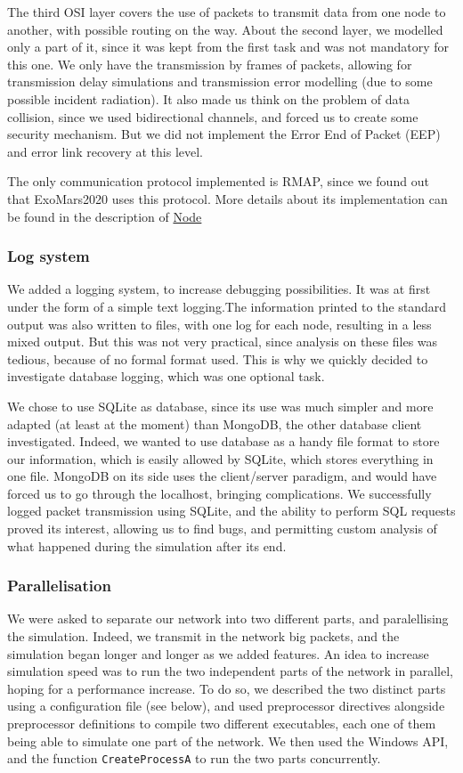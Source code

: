 \documentclass[12pt,a4paper]{article}
\begin{document}
The third OSI layer covers the use of packets to transmit data from one node to another, with possible routing on the way. About the second layer, we modelled only a part of it, since it was kept from the first task and was not mandatory for this one. We only have the transmission by frames of packets, allowing for transmission delay simulations and transmission error modelling (due to some possible incident radiation). It also made us think on the problem of data collision, since we used bidirectional channels, and forced us to create some security mechanism. But we did not implement the Error End of Packet (EEP) and error link recovery at this level.

The only communication protocol implemented is RMAP, since we found out that ExoMars2020 uses this protocol. More details about its implementation can be found in the description of \hyperref[ssec:Node]{Node}
\subsubsection*{Log system}
We added a logging system, to increase debugging possibilities. It was at first under the form of a simple text logging.The information printed to the standard output was also written to files, with one log for each node, resulting in a less mixed output. But this was not very practical, since analysis on these files was tedious, because of no formal format used. This is why we quickly decided to investigate database logging, which was one optional task.

We chose to use SQLite as database, since its use was much simpler and more adapted (at least at the moment) than MongoDB, the other database client investigated. Indeed, we wanted to use database as a handy file format to store our information, which is easily allowed by SQLite, which stores everything in one file. MongoDB on its side uses the client/server paradigm, and would have forced us to go through the localhost, bringing complications. We successfully logged packet transmission using SQLite, and the ability to perform SQL requests proved its interest, allowing us to find bugs, and permitting custom analysis of what happened during the simulation after its end.

\subsubsection*{Parallelisation}
We were asked to separate our network into two different parts, and paralellising the simulation. Indeed, we transmit in the network big packets, and the simulation began longer and longer as we added features. An idea to increase simulation speed was to run the two independent parts of the network in parallel, hoping for a performance increase. To do so, we described the two distinct parts using a configuration file (see below), and used preprocessor directives alongside preprocessor definitions to compile two different executables, each one of them being able to simulate one part of the network. We then used the Windows API, and the function \texttt{CreateProcessA} to run the two parts concurrently.
\end{document}
